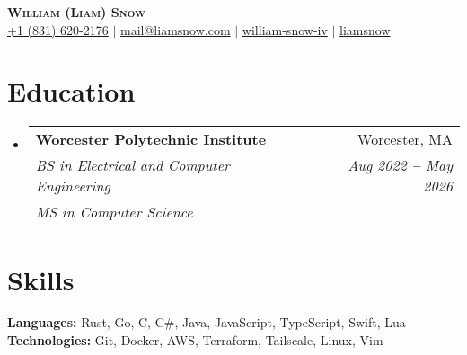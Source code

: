 \documentclass[12pt]{article}
\makeatletter
\newcommand{\entry}[1]{
  \item\small{
    {#1 \vspace{-2pt}}
  }
}
\newcommand{\educationheading}[6]{
  \vspace{-2pt}\item
    \begin{tabular*}{0.97\textwidth}[t]{l@{\extracolsep{\fill}}r}
      \textbf{#1} & #2 \\
      \textit{\small#3} & \textit{\small #4} \\
      \textit{\small#5} & \textit{\small #6} \\
    \end{tabular*}\vspace{-5pt}
}
\newcommand{\subheadingliststart}{\begin{itemize}[leftmargin=0.15in, label={}]}
\newcommand{\subheadinglistend}{\end{itemize}}
\makeatother
\begin{document}
\begin{center}
  \textbf{\Huge \scshape William (Liam) Snow} \\ \vspace{3pt}
    \small
    \faMobile \hspace{.5pt} \href{tel:8316202176}{+1 (831) 620-2176}
    $|$
    \faAt \hspace{.5pt} \href{mailto:mail@liamsnow.com}{mail@liamsnow.com}
    $|$
    \faLinkedinSquare \hspace{.5pt} \href{https://www.linkedin.com/in/william-snow-iv-140438169/}{william-snow-iv}
    $|$
    \faGithub \hspace{.5pt} \href{https://github.com/liamsnow}{liamsnow}
\end{center}

\section{Education}
  \vspace{3pt}
  \subheadingliststart
    \educationheading
      {Worcester Polytechnic Institute}{Worcester, MA}
      {BS in Electrical and Computer Engineering}{Aug 2022 \textbf{--} May 2026}
      {MS in Computer Science}{}
  \subheadinglistend

\section{Skills}
  \vspace{2pt}
  \subheadingliststart
    \small{\entry{
        \textbf{Languages:}{ Rust, Go, C, C\#, Java, JavaScript, TypeScript, Swift, Lua } \\ \vspace{3pt}
        \textbf{Technologies:}{ Git, Docker, AWS, Terraform, Tailscale, Linux, Vim } \\ \vspace{3pt}
    }}
  \subheadinglistend
\end{document}
